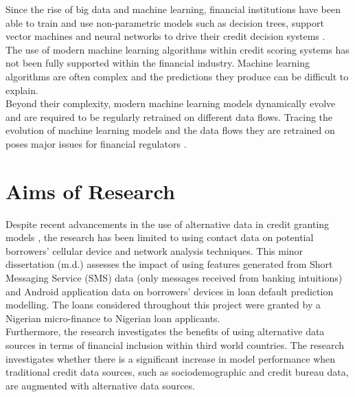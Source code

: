 Since the rise of big data and machine learning, financial institutions have been able to train and use non-parametric models such as decision trees, support vector machines and neural networks to drive their credit decision systems \parencite{IntroToCreditModelling}. \\

The use of modern machine learning algorithms within credit scoring systems has not been fully supported within the financial industry. Machine learning algorithms are often complex and the predictions they produce can be difficult to explain. \\

Beyond their complexity, modern machine learning models dynamically evolve and are required to be regularly retrained on different data flows. Tracing the evolution of machine learning models and the data flows they are retrained on poses major issues for financial regulators \parencite{Regulation}. \\


\section{Aims of Research}

Despite recent advancements in the use of alternative data in credit granting models \parencite{BigDataMicroFiance}, the research has been limited to using contact data on potential borrowers' cellular device and network analysis techniques. This minor dissertation (m.d.) assesses the impact of using features generated from Short Messaging Service (SMS) data (only messages received from banking intuitions) and Android application data on borrowers' devices in loan default prediction modelling. The loans considered throughout this project were granted by a Nigerian micro-finance to Nigerian loan applicants. \\

Furthermore, the research investigates the benefits of using alternative data sources in terms of financial inclusion within third world countries. The research investigates whether there is a significant increase in model performance when traditional credit data sources, such as sociodemographic and credit bureau data, are augmented with alternative data sources.  \\

